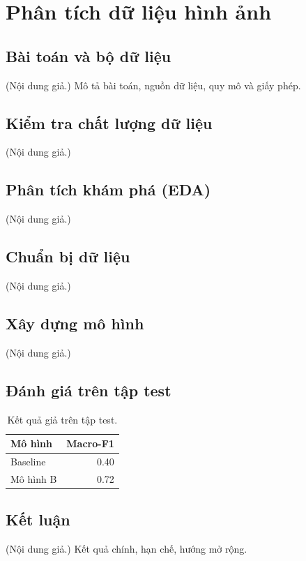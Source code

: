 \chapter{Phân tích dữ liệu hình ảnh}

\section{Bài toán và bộ dữ liệu}
(Nội dung giả.) Mô tả bài toán, nguồn dữ liệu, quy mô và giấy phép.

\section{Kiểm tra chất lượng dữ liệu}
(Nội dung giả.)

\section{Phân tích khám phá (EDA)}
(Nội dung giả.)

\section{Chuẩn bị dữ liệu}
(Nội dung giả.)

\section{Xây dựng mô hình}
(Nội dung giả.)

\section{Đánh giá trên tập test}
\begin{table}[H]\centering
\caption{Kết quả giả trên tập test.}
\begin{tabular}{lr}\toprule Mô hình & Macro-F1 \\ \midrule Baseline & 0.40 \\ Mô hình B & 0.72 \\ \bottomrule\end{tabular}
\end{table}

\section{Kết luận}
(Nội dung giả.) Kết quả chính, hạn chế, hướng mở rộng.
